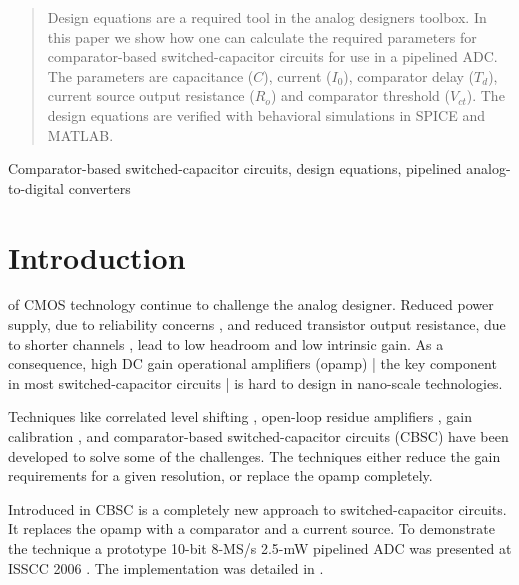 
\begin{abstract}
Design equations are a required tool in the  analog designers
toolbox. In this paper we show how one can calculate the required
parameters for 
comparator-based switched-capacitor circuits for use in a pipelined ADC. The parameters are
capacitance ($C$), current ($I_0$), comparator delay ($T_d$), current
source output resistance ($R_o$) and comparator threshold 
($V_{ct}$). The design equations
are verified with behavioral simulations in SPICE and MATLAB.
\end{abstract}


\begin{keywords}
 Comparator-based switched-capacitor circuits, design equations,
 pipelined analog-to-digital converters
\end{keywords}
\section{Introduction}
 of CMOS technology continue to challenge the analog
designer. Reduced power supply, due to reliability concerns
\cite{iwai99}, and reduced
transistor output resistance, due to shorter channels
\cite{annema05}, lead to low headroom and low intrinsic
gain. As a consequence, high DC gain
operational amplifiers (opamp) | the key component in most
switched-capacitor circuits | is hard to design in nano-scale
technologies. 

Techniques like correlated level shifting
\cite{gregoire08}, open-loop residue amplifiers \cite{murmann03}, gain calibration \cite{hernes07},  and
comparator-based switched-capacitor circuits (CBSC)  \cite{sepke06} have been
developed to solve  some of the challenges. The techniques either reduce the
gain requirements for a given resolution, or replace the
opamp completely. 


Introduced in
\cite{sepke06} CBSC is a completely new approach to switched-capacitor
circuits. It replaces the opamp with a comparator and a current
source. To demonstrate the technique a prototype 10-bit 8-MS/s 
2.5-mW pipelined ADC was presented at ISSCC 2006  \cite{sepke06}. The implementation was detailed in
\cite{fiorenza06}.

